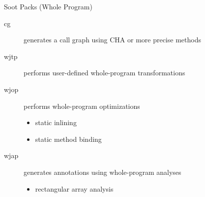 \begin{slide}{Soot Packs (Whole Program)}
\begin{description}
\item[cg] generates a call graph using CHA or more precise methods
\item[wjtp] performs user-defined whole-program transformations
\item[wjop] performs whole-program optimizations
\begin{itemize}
\item static inlining
\item static method binding
\end{itemize}
\item[wjap] generates annotations using whole-program analyses
\begin{itemize}
\item rectangular array analysis
\end{itemize}
\end{description}
\end{slide}



